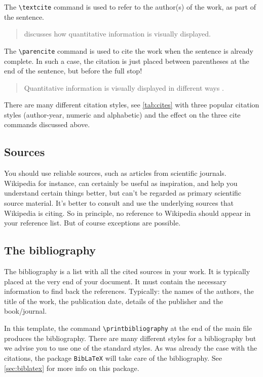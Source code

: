 The \verb|\textcite| command is used to refer to the author(s) of the work, as part of the sentence.
\begin{quotation}
 \textcite{tufte2001} discusses how quantitative information is visually displayed.
\end{quotation}

The \verb|\parencite| command is used to cite the work when the sentence is already complete. In such a case, the citation is just placed between parentheses at the end of the sentence, but before the full stop!
\begin{quotation}
 Quantitative information is visually displayed in different ways \parencite{tufte2001}.
\end{quotation}

There are many different citation styles, see \cref{tab:cites} with three popular citation styles (author-year, numeric and alphabetic) and the effect on the three cite commands discussed above.

\subsection{Sources}
You should use reliable sources, such as articles from scientific journals. Wikipedia for instance, can certainly be useful as inspiration, and help you understand certain things better, but can't be regarded as primary scientific source material. It's better to consult and use the underlying sources that Wikipedia is citing. So in principle, no reference to Wikipedia should appear in your reference list. But of course exceptions are possible.

\subsection{The bibliography}
The bibliography is a list with all the cited sources in your work. It is typically placed at the very end of your document. It must contain the necessary information to find back the references. Typically: the names of the authors, the title of the work, the publication date, details of the publisher and the book/journal.

In this template, the command \verb|\printbibliography| at the end of the main file produces the bibliography. There are many different styles for a bibliography but we advise you to use one of the standard styles. As was already the case with the citations, the package \texttt{BibLaTeX} will take care of the bibliography. See \cref{sec:biblatex} for more info on this package.

